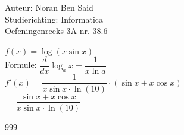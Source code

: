 \documentclass[a4paper]{article}
\begin{document}
\noindent \large Auteur: Noran Ben Said\\
\noindent \large Studierichting: Informatica\\
\noindent \large Oefeningenreeks 3A nr. 38.6 \\

\medskip
\normalsize

$f(x) = \log(x\sin x)$\\

Formule: $\dfrac{d}{dx}\log_a x = \dfrac{1}{x\ln a}$\\

$f'(x) = \dfrac{1}{x\sin x \cdot \ln(10)}\cdot (\sin x + x\cos x)$\\

$ = \dfrac{\sin x + x\cos x}{x\sin x \cdot \ln(10)}$\\



\begin{thebibliography}{999}
\end{thebibliography}
\end{document}
